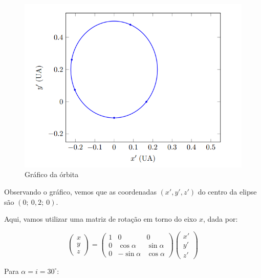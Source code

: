 \documentclass[11pt]{article}
\begin{document}
\begin{pproblem}
\begin{pssolution*}{}{}
\begin{alternativas}
            \begin{figure}[H]
                \centering
                \includegraphics[width=0.7\linewidth]{imagens/graforbt.png}  
                \caption{Gráfico da órbita} 
            \end{figure}

            Observando o gráfico, vemos que as coordenadas \((x', y', z')\) do centro da elipse são \(\boxed{(0;\ 0,2; \ 0)}\).

        \item Aqui, vamos utilizar uma matriz de rotação em torno do eixo \(x\), dada por:
        
            \[
            \begin{pmatrix}
            x \\
            y \\
            z
            \end{pmatrix}
            =
            \begin{pmatrix}
            1 & 0 & 0 \\
            0 & \cos \alpha & \sin \alpha \\
            0 & -\sin \alpha & \cos \alpha
            \end{pmatrix}
            \begin{pmatrix}
            x' \\
            y' \\
            z'
            \end{pmatrix}
            \] 

            Para \(\alpha=i=30^\circ\):


\end{alternativas}
\end{pssolution*}
\end{pproblem}
\end{document}
